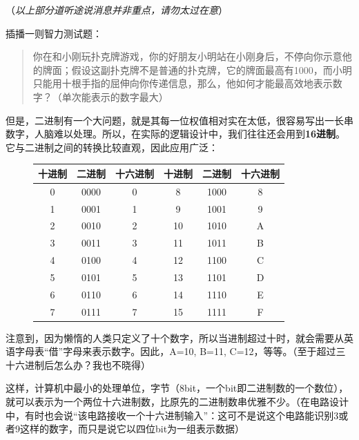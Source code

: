 \documentclass[UTF8]{ctexart}
\begin{document}
（\textit{以上部分道听途说消息并非重点，请勿太过在意}）

插播一则智力测试题：
\begin{quote}
你在和小刚玩扑克牌游戏，你的好朋友小明站在小刚身后，不停向你示意他的牌面；假设这副扑克牌不是普通的扑克牌，它的牌面最高有1000，而小明只能用十根手指的屈伸向你传递信息，那么，他如何才能最高效地表示数字？（单次能表示的数字最大）
\end{quote}
但是，二进制有一个大问题，就是其每一位权值相对实在太低，很容易写出一长串数字，人脑难以处理。所以，在实际的逻辑设计中，我们往往还会用到\textbf{16进制}。它与二进制之间的转换比较直观，因此应用广泛：

\begin{figure}
    \begin{tabular}{|c|c|c|c|c|c|}\hline\rowcolor{lightgray}
        十进制 & 二进制 & 十六进制 & 十进制 & 二进制 & 十六进制\\\hline
        0&0000&0&8 &1000&8\\\hline
        1&0001&1&9 &1001&9\\\hline
        2&0010&2&10&1010&A\\\hline
        3&0011&3&11&1011&B\\\hline
        4&0100&4&12&1100&C\\\hline
        5&0101&5&13&1101&D\\\hline
        6&0110&6&14&1110&E\\\hline
        7&0111&7&15&1111&F\\\hline
    \end{tabular}
\end{figure}

注意到，因为懒惰的人类只定义了十个数字，所以当进制超过十时，就会需要从英语字母表“借”字母来表示数字。因此，A=10, B=11, C=12，等等。（至于超过三十六进制后怎么办？我也不晓得）

这样，计算机中最小的处理单位，字节（8bit，一个bit即二进制数的一个数位），就可以表示为一个两位十六进制数，比原先的二进制数串优雅不少。（在电路设计中，有时也会说“该电路接收一个十六进制输入”：这可不是说这个电路能识别3或者9这样的数字，而只是说它以四位bit为一组表示数据）
\end{document}
